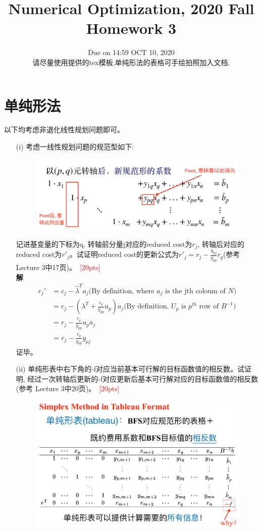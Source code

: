 \documentclass[10pt]{article}
\begin{document}
	
\title{	Numerical Optimization, 2020 Fall\\Homework 3}
\date{Due on 14:59 OCT 10, 2020\\
	请尽量使用提供的tex模板,单纯形法的表格可手绘拍照加入文档.
	}
\maketitle

\section{单纯形法}
以下均考虑非退化线性规划问题即可。
\begin{enumerate}
	\item[(i)] 考虑一线性规划问题的规范型如下:
	\begin{figure}[H]
		\centering
		\includegraphics[width=0.55\linewidth]{hw3_1.png}
		\label{fig.prob1}
	\end{figure}
	记进基变量的下标为q, 转轴前分量j对应的reduced cost为$r_j$, 转轴后对应的reduced cost为$r'_j$。试证明reduced cost的更新公式为$r'_j=r_j - \frac{y_{pj}}{y_{pq}} r_q$(参考 Lecture 3中17页)。~\textcolor{red}{[20pts]}\\
	\textbf{解}\\
	\begin{align*}
	r_j'&=c_j-\hat{\lambda}^Ta_j \text{(By definition, where $a_j$ is the jth coloum of $N$)}\\	
	&=c_j-(\lambda^T+\frac{r_q}{y_{pq}}u_p)a_j \text{(By definition. $U_p$ is $p^{th}$ row of $B^{-1}$)}\\
	&=r_j - \frac{r_q}{y_{pq}}u_pa_j\\
	&=r_j-\frac{r_q}{y_{pq}}y_{pj}
	\end{align*}
	证毕。
	\item[(ii)] 单纯形表中右下角的-f对应当前基本可行解的目标函数值的相反数。试证明, 经过一次转轴后更新的-f对应更新后基本可行解对应的目标函数值的相反数 (参考 Lecture 3中20页)。~\textcolor{red}{[20pts]}
	\begin{figure}[H]
		\centering
		\includegraphics[width=0.55\linewidth]{hw3_2.png}

\end{figure}
\end{enumerate}
\end{document}
